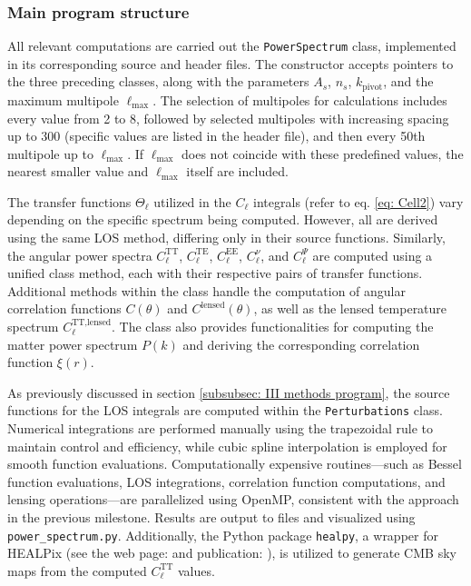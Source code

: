 \documentclass{aa}
\numberwithin{equation}{section}
\numberwithin{table}{section}
\numberwithin{figure}{section}
\begin{document}
\subsubsection{Main program structure}
All relevant computations are carried out the \verb|PowerSpectrum| class, implemented in its corresponding source and header files. The constructor accepts pointers to the three preceding classes, along with the parameters $A_s$, $n_s$, $k_{\text{pivot}}$, and the maximum multipole $\ell_{\text{max}}$. The selection of multipoles for calculations includes every value from 2 to 8, followed by selected multipoles with increasing spacing up to 300 (specific values are listed in the header file), and then every 50th multipole up to $\ell_{\text{max}}$. If $\ell_{\text{max}}$ does not coincide with these predefined values, the nearest smaller value and $\ell_{\text{max}}$ itself are included.

The transfer functions $\Theta_\ell$ utilized in the $C_\ell$ integrals (refer to eq. \eqref{eq: Cell2}) vary depending on the specific spectrum being computed. However, all are derived using the same LOS method, differing only in their source functions. Similarly, the angular power spectra $C_\ell^{\text{TT}}$, $C_\ell^{\text{TE}}$, $C_\ell^{\text{EE}}$, $C_\ell^{\nu}$, and $C_\ell^{\Psi}$ are computed using a unified class method, each with their respective pairs of transfer functions. Additional methods within the class handle the computation of angular correlation functions $C(\theta)$ and $C^{\text{lensed}}(\theta)$, as well as the lensed temperature spectrum $C_\ell^{\text{TT,lensed}}$. The class also provides functionalities for computing the matter power spectrum $P(k)$ and deriving the corresponding correlation function $\xi(r)$.

As previously discussed in section \ref{subsubsec: III methods program}, the source functions for the LOS integrals are computed within the \verb|Perturbations| class. Numerical integrations are performed manually using the trapezoidal rule to maintain control and efficiency, while cubic spline interpolation is employed for smooth function evaluations. Computationally expensive routines—such as Bessel function evaluations, LOS integrations, correlation function computations, and lensing operations—are parallelized using OpenMP, consistent with the approach in the previous milestone. Results are output to files and visualized using \verb|power_spectrum.py|. Additionally, the Python package \verb|healpy|, a wrapper for HEALPix (see the web page: \cite{HEALPix} and publication: \cite{Gorski2005}), is utilized to generate CMB sky maps from the computed $C_\ell^{\text{TT}}$ values.
\end{document}
